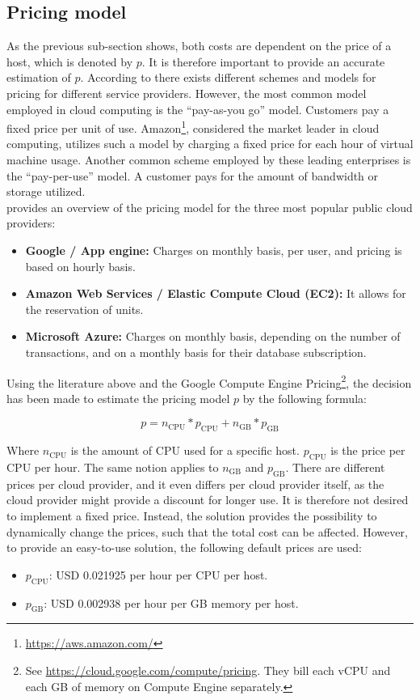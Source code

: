\subsection{Pricing model} \label{sec:pricing}
As the previous sub-section shows, both costs are dependent on the price of a host, which is denoted by $p$. It is therefore important to provide an accurate estimation of $p$. According to \cite{bulla2014cloud} there exists different schemes and models for pricing for different service providers. However, the most common model employed in cloud computing is the ``pay-as-you go'' model. Customers pay a fixed price per unit of use. Amazon\footnote{\url{https://aws.amazon.com/}}, considered the market leader in cloud computing, utilizes such a model by charging a fixed price for each hour of virtual machine usage. 
Another common scheme employed by these leading enterprises is the ``pay-per-use'' model. A customer pays for the amount of bandwidth or storage utilized.\\

\noindent
\cite{mazrekaj2016pricing} provides an overview of the pricing model for the three most popular public cloud providers:
\begin{itemize}
    \item \textbf{Google / App engine: }Charges on monthly basis, per user, and pricing is based on hourly basis.
    \item \textbf{Amazon Web Services / Elastic Compute Cloud (EC2): }It allows for the reservation of units.
    \item \textbf{Microsoft Azure: }Charges on monthly basis, depending on the number of transactions, and on a monthly basis for their database subscription.
\end{itemize}

Using the literature above and the Google Compute Engine Pricing\footnote{See \url{https://cloud.google.com/compute/pricing}. They bill each vCPU and each GB of memory on Compute Engine separately.}, the decision has been made to estimate the pricing model $p$ by the following formula:

\begin{equation} \label{eq:p}
p =  n_\text{CPU} * p_\text{CPU} + n_\text{GB} * p_\text{GB}
\end{equation}

\noindent
Where $n_\text{CPU}$ is the amount of CPU used for a specific host. $p_\text{CPU}$ is the price per CPU per hour. The same notion applies to $n_\text{GB}$ and $p_\text{GB}$. There are different prices per cloud provider, and it even differs per cloud provider itself, as the cloud provider might provide a discount for longer use. It is therefore not desired to implement a fixed price. Instead, the solution provides the possibility to dynamically change the prices, such that the total cost can be affected. However, to provide an easy-to-use solution, the following default prices are used:
\begin{itemize}
    \item $p_\text{CPU}$: USD 0.021925 per hour per CPU per host.
    \item $p_\text{GB}$: USD 0.002938 per hour per GB memory per host.
\end{itemize}

